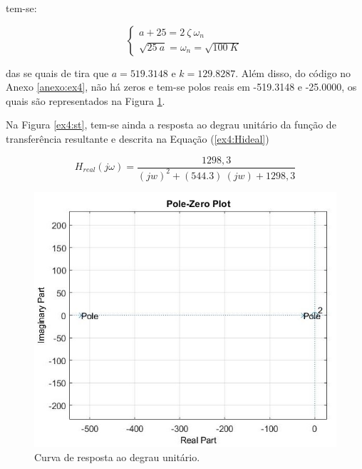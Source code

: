 \documentclass[a4paper,12pt,oneside,openany,table,xcdraw]{article}
\begin{document}
\vspace{0.1cm}
tem-se:

\begin{equation*}
\begin{cases}
a+25=2\ \zeta \ \omega _{n}\\
\sqrt{25\ a} =\omega _{n} =\sqrt{100\ K}
\end{cases}
\end{equation*}
\vspace{0.4cm}

das se quais de tira que $a=519.3148$ e $k=129.8287$. Além disso, do código no Anexo \ref{anexo:ex4}, não há zeros e tem-se polos reais em -519.3148 e
  -25.0000, os quais são representados na Figura \ref{ex4:zp}. 

Na Figura \ref{ex4:st}, tem-se ainda a resposta ao degrau unitário da função de transferência resultante e descrita na Equação (\ref{ex4:Hideal})

\vspace{0.4cm}
\begin{equation} \label{ex4:Hideal}
H_{real}(j\omega) =\dfrac{1298,3}{(jw)^2 + (544.3)\ (jw) + 1298,3}
\end{equation}

\vspace{0.4cm}
\begin{figure}[H]
\centering
\includegraphics[width=13.5cm]{ex4-zp}
\caption{Curva de resposta ao degrau unitário.}
\label{ex4:zp}
\end{figure}
\end{document}
